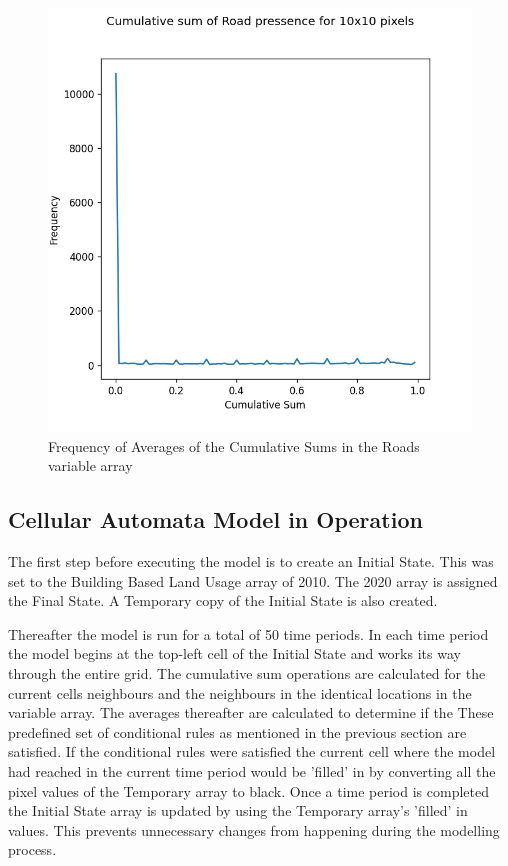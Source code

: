 \begin{figure}[H]
\centering
\includegraphics[scale=0.7]{Figures/Chapter3/roadsSum}
\caption{Frequency of Averages of the Cumulative Sums in the Roads variable array}
\label{fig:cumsumroad}
\end{figure}
\subsection{Cellular Automata Model in Operation}
\label{sec:runmod}
The first step before executing the model is to create an Initial State. This was set to the Building Based Land Usage array of 2010. The 2020 array is assigned the Final State. A Temporary copy of the Initial State is also created.

Thereafter the model is run for a total of 50 time periods. In each time period the model begins at the top-left cell of the Initial State and works its way through the entire grid. The cumulative sum operations are calculated for the current cells neighbours and the neighbours in the identical locations in the variable array. The averages thereafter are calculated to determine if the These predefined set of conditional rules as mentioned in the previous section are satisfied. If the conditional rules were satisfied the current cell where the model had reached in the current time period would be 'filled' in by converting all the pixel values of the Temporary array to black. Once a time period is completed the Initial State array is updated by using the Temporary array's 'filled' in values. This prevents unnecessary changes from happening during the modelling process.

